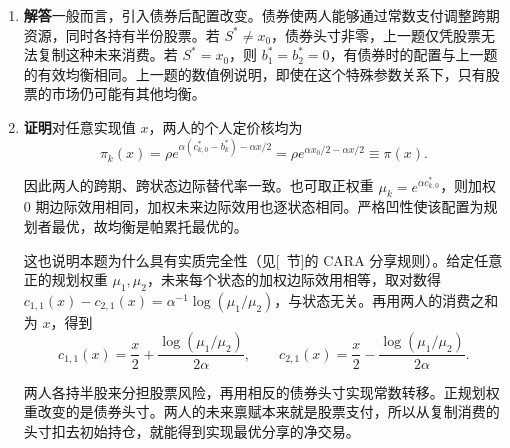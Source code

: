 \begin{solution}[blank-type=manual,blank-vsep=12\baselineskip]
\begin{enumerate}[label=(\alph*)]
均衡净利率为 $r_F^*=1/B^*-1$。各人消费为 $c_{k,0}^*=x_0/2+b_k^*$、$\widetilde c_{k,1}^*=\widetilde x/2+b_k^*$。严格凹性保证个人最优性，且 $b_1^*+b_2^*=0$ 使消费分别加总为 $x_0$ 和 $\widetilde x$，故商品与证券均出清。

\item \textbf{解答}\quad 一般而言，引入债券后配置改变。债券使两人能够通过常数支付调整跨期资源，同时各持有半份股票。若 $S^*\ne x_0$，债券头寸非零，上一题仅凭股票无法复制这种未来消费。若 $S^*=x_0$，则 $b_1^*=b_2^*=0$，有债券时的配置与上一题的有效均衡相同。上一题的数值例说明，即使在这个特殊参数关系下，只有股票的市场仍可能有其他均衡。

\item \textbf{证明}\quad 对任意实现值 $x$，两人的个人定价核均为
\[
 \pi_k(x)=\rho e^{\alpha(c_{k,0}^*-b_k^*)-\alpha x/2}
 =\rho e^{\alpha x_0/2-\alpha x/2}\equiv\pi(x).
\]

因此两人的跨期、跨状态边际替代率一致。也可取正权重 $\mu_k=e^{\alpha c_{k,0}^*}$，则加权 0 期边际效用相同，加权未来边际效用也逐状态相同。严格凹性使该配置为规划者最优，故均衡是帕累托最优的。

这也说明本题为什么具有实质完全性\ifdefined\WJHandoutKnowledge（见[~节]的 CARA 分享规则）\fi。给定任意正的规划权重 $\mu_1,\mu_2$，未来每个状态的加权边际效用相等，取对数得 $c_{1,1}(x)-c_{2,1}(x)=\alpha^{-1}\log(\mu_1/\mu_2)$，与状态无关。再用两人的消费之和为 $x$，得到
\[
 c_{1,1}(x)=\frac{x}{2}+\frac{\log(\mu_1/\mu_2)}{2\alpha},
 \qquad
 c_{2,1}(x)=\frac{x}{2}-\frac{\log(\mu_1/\mu_2)}{2\alpha}.
\]

两人各持半股来分担股票风险，再用相反的债券头寸实现常数转移。正规划权重改变的是债券头寸。两人的未来禀赋本来就是股票支付，所以从复制消费的头寸扣去初始持仓，就能得到实现最优分享的净交易。
\end{enumerate}
\end{solution}

